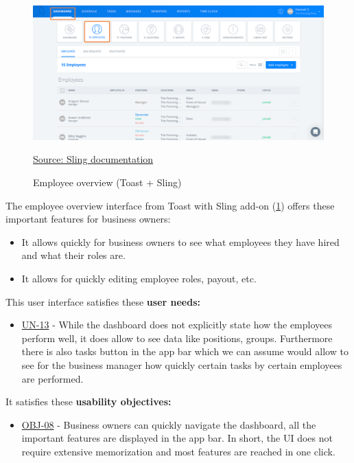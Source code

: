 \documentclass[]{VUMIFTemplateClass}
\begin{document}
\begin{figure}[H]
    \centering
    \includegraphics[width=\textwidth]{docs/computer-interaction/1 assignment/images/examples/toast+Sling_employee_management.png}
    \caption{Employee overview (Toast + Sling)}
    \href{https://support.getsling.com/en/articles/8981593-sling-toast-admin-manual}{Source: Sling documentation}
    \label{fig:employee-overview}
\end{figure}

The employee overview interface from Toast with Sling add-on (\ref{fig:employee-overview}) offers these important features for business owners:

\begin{itemize}
    \item It allows quickly for business owners to see what employees they have hired and what their roles are.
    \item It allows for quickly editing employee roles, payout, etc.
\end{itemize}

This user interface satisfies these \textbf{user needs:}

\begin{itemize}
    \item \hyperref[UN-13]{UN-13} - While the dashboard does not explicitly state how the employees perform well, it does allow to see data like positions, groups. Furthermore there is also tasks button in the app bar which we can assume would allow to see for the business manager how quickly certain tasks by certain employees are performed.
\end{itemize}

It satisfies these \textbf{usability objectives:}

\begin{itemize}
    \item \hyperref[OBJ-08]{OBJ-08} - Business owners can quickly navigate the dashboard, all the important features are displayed in the app bar. In short, the UI does not require extensive memorization and most features are reached in one click.
\end{itemize}
\end{document}
